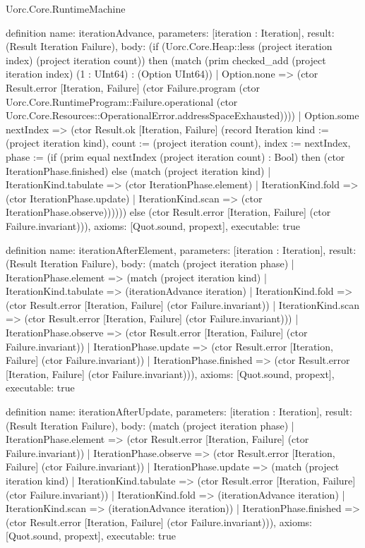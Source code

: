 \begin{lexlean}{Uorc.Core.RuntimeMachine}
\begin{semanticmodule}
definition{
  name: iterationAdvance,
  parameters: [iteration : Iteration],
  result: (Result Iteration Failure),
  body: (if (Uorc.Core.Heap::less (project iteration index) (project iteration count)) then (match (prim checked_add (project iteration index) (1 : UInt64) : (Option UInt64))
    | Option.none => (ctor Result.error [Iteration, Failure] (ctor Failure.program (ctor Uorc.Core.RuntimeProgram::Failure.operational (ctor Uorc.Core.Resources::OperationalError.addressSpaceExhausted))))
    | Option.some nextIndex => (ctor Result.ok [Iteration, Failure] (record Iteration {kind := (project iteration kind), count := (project iteration count), index := nextIndex, phase := (if (prim equal nextIndex (project iteration count) : Bool) then (ctor IterationPhase.finished) else (match (project iteration kind)
      | IterationKind.tabulate => (ctor IterationPhase.element)
      | IterationKind.fold => (ctor IterationPhase.update)
      | IterationKind.scan => (ctor IterationPhase.observe)))}))) else (ctor Result.error [Iteration, Failure] (ctor Failure.invariant))),
  axioms: [Quot.sound, propext],
  executable: true
}

definition{
  name: iterationAfterElement,
  parameters: [iteration : Iteration],
  result: (Result Iteration Failure),
  body: (match (project iteration phase)
    | IterationPhase.element => (match (project iteration kind)
      | IterationKind.tabulate => (iterationAdvance iteration)
      | IterationKind.fold => (ctor Result.error [Iteration, Failure] (ctor Failure.invariant))
      | IterationKind.scan => (ctor Result.error [Iteration, Failure] (ctor Failure.invariant)))
    | IterationPhase.observe => (ctor Result.error [Iteration, Failure] (ctor Failure.invariant))
    | IterationPhase.update => (ctor Result.error [Iteration, Failure] (ctor Failure.invariant))
    | IterationPhase.finished => (ctor Result.error [Iteration, Failure] (ctor Failure.invariant))),
  axioms: [Quot.sound, propext],
  executable: true
}

definition{
  name: iterationAfterUpdate,
  parameters: [iteration : Iteration],
  result: (Result Iteration Failure),
  body: (match (project iteration phase)
    | IterationPhase.element => (ctor Result.error [Iteration, Failure] (ctor Failure.invariant))
    | IterationPhase.observe => (ctor Result.error [Iteration, Failure] (ctor Failure.invariant))
    | IterationPhase.update => (match (project iteration kind)
      | IterationKind.tabulate => (ctor Result.error [Iteration, Failure] (ctor Failure.invariant))
      | IterationKind.fold => (iterationAdvance iteration)
      | IterationKind.scan => (iterationAdvance iteration))
    | IterationPhase.finished => (ctor Result.error [Iteration, Failure] (ctor Failure.invariant))),
  axioms: [Quot.sound, propext],
  executable: true
}


\end{semanticmodule}
\end{lexlean}
